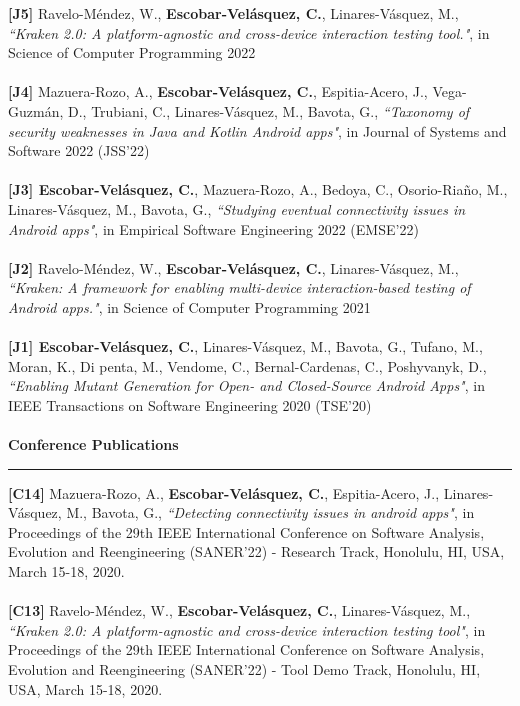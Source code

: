 \documentclass[letterpaper,11pt,oneside]{article}
\begin{document}
\noindent \textbf{[J5]} Ravelo-Méndez, W., \textbf{Escobar-Velásquez, C.},  Linares-Vásquez, M., \textit{``Kraken 2.0: A platform-agnostic and cross-device interaction testing tool."}, in Science of Computer Programming 2022\\
\\
\noindent \textbf{[J4]} Mazuera-Rozo, A., \textbf{Escobar-Velásquez, C.}, Espitia-Acero, J., Vega-Guzm\'an, D., Trubiani, C., Linares-V\'asquez, M., Bavota, G., \textit{``Taxonomy of security weaknesses in Java and Kotlin Android apps"}, in Journal of Systems and Software 2022 (JSS'22)\\
\\
\noindent \textbf{[J3] Escobar-Velásquez, C.}, Mazuera-Rozo, A., Bedoya, C., Osorio-Riaño, M., Linares-Vásquez, M., Bavota, G., \textit{``Studying eventual connectivity issues in Android apps"}, in Empirical Software Engineering 2022 (EMSE'22)\\
\\
\noindent \textbf{[J2]} Ravelo-Méndez, W., \textbf{Escobar-Velásquez, C.},  Linares-Vásquez, M., \textit{``Kraken: A framework for enabling multi-device interaction-based testing of Android apps."}, in Science of Computer Programming 2021\\
\\
\noindent \textbf{[J1] Escobar-Velásquez, C.}, Linares-V\'asquez, M., Bavota, G., Tufano, M., Moran, K., Di penta, M., Vendome, C., Bernal-Cardenas, C., Poshyvanyk, D., \textit{``Enabling Mutant Generation for Open- and Closed-Source Android Apps"}, in IEEE Transactions on Software Engineering 2020 (TSE’20)\\
\\
\noindent \Large{\textbf{Conference Publications}} \\
\vspace{-2ex}
\hrule 
\normalsize
\vspace{2ex}
\noindent \textbf{[C14]} Mazuera-Rozo, A., \textbf{Escobar-Velásquez, C.}, Espitia-Acero, J., Linares-V\'asquez, M., Bavota, G., \textit{``Detecting connectivity issues in android apps"}, in Proceedings of the 29th IEEE International Conference on Software Analysis, Evolution and Reengineering (SANER'22) - Research Track, Honolulu, HI, USA, March 15-18, 2020. \\
\\
\noindent \textbf{[C13]} Ravelo-Méndez, W., \textbf{Escobar-Velásquez, C.},  Linares-Vásquez, M., \textit{``Kraken 2.0: A platform-agnostic and cross-device interaction testing tool"}, in Proceedings of the 29th IEEE International Conference on Software Analysis, Evolution and Reengineering (SANER'22) - Tool Demo Track, Honolulu, HI, USA, March 15-18, 2020. \\
\end{document}
